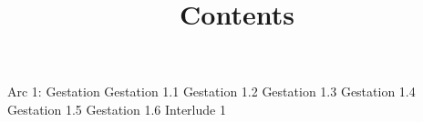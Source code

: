 \title{Contents}
Arc 1: Gestation
Gestation 1.1
Gestation 1.2
Gestation 1.3
Gestation 1.4
Gestation 1.5
Gestation 1.6
Interlude 1

